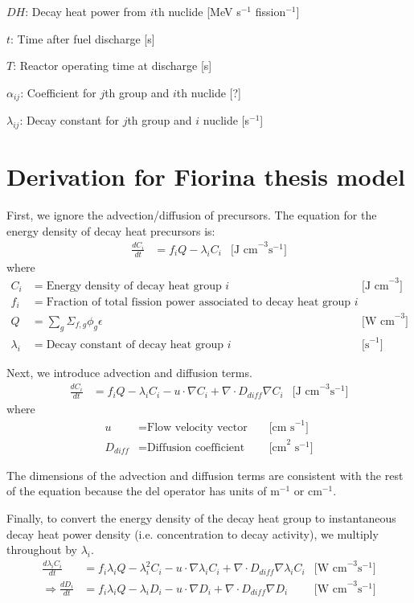 \documentclass[letterpaper,11pt]{article}
\begin{document}
$DH$: Decay heat power from $i$th nuclide [MeV s$^{-1}$ fission$^{-1}$]

$t$: Time after fuel discharge [s]

$T$: Reactor operating time at discharge [s]

$\alpha_{ij}$: Coefficient for $j$th group and $i$th nuclide [?]

$\lambda_{ij}$: Decay constant for $j$th group and $i$ nuclide [s$^{-1}$]

\pagebreak

\section*{Derivation for Fiorina thesis model}

First, we ignore the advection/diffusion of precursors. The equation for the
energy density of decay heat precursors is:
%
\begin{align}
\frac{dC_i}{dt} &= f_i Q - \lambda_i C_i & \text{[J cm}^{-3} \text{s}^{-1} \text{]}
\end{align}
%
where
%
\begin{align*}
C_i &= \text{Energy density of decay heat group }i & &\text{ [J cm}^{-3}] \\
f_i &= \text{Fraction of total fission power associated to decay heat group }i & &\\
Q &= \sum_g \Sigma_{f,g} \phi_g \epsilon & &\text{ [W cm}^{-3}\text{]}\\
\lambda_i &= \text{Decay constant of decay heat group }i & &\text{ [s}^{-1}\text{]}
\end{align*}

Next, we introduce advection and diffusion terms.
%
\begin{align}
\frac{dC_i}{dt} &= f_i Q - \lambda_i C_i - u \cdot\nabla C_i + \nabla \cdot D_{diff} \nabla C_i & \text{[J cm}^{-3} \text{s}^{-1} \text{]}
\end{align}
%
where
%
\begin{align*}
u &= \text{Flow velocity vector} & &\text{ [cm s}^{-1}\text{]} \\
D_{diff} &= \text{Diffusion coefficient} & &\text{ [cm}^2\text{ s}^{-1}\text{]}
\end{align*}

The dimensions of the advection and diffusion terms are consistent with the
rest of the equation because the del operator has units of m$^{-1}$ or
cm$^{-1}$.

Finally, to convert the energy density of the decay heat group to
instantaneous decay heat power density (i.e. concentration to decay activity),
we multiply throughout by $\lambda_i$.
%
\begin{align}
\frac{d \lambda_i C_i}{dt} &= f_i \lambda_i Q - \lambda_i^2 C_i - u \cdot\nabla \lambda_i C_i + \nabla \cdot D_{diff} \nabla \lambda_i C_i & \text{[W cm}^{-3} \text{s}^{-1} \text{]} \\
\Rightarrow \frac{d D_i}{dt} &= f_i \lambda_i Q - \lambda_i D_i - u \cdot\nabla D_i + \nabla \cdot D_{diff} \nabla D_i & \text{[W cm}^{-3} \text{s}^{-1} \text{]}
\end{align}
\end{document}
